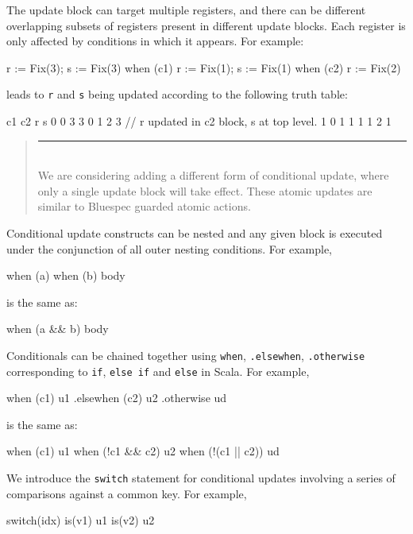 \documentclass[twocolumn,10pt]{article}
\newenvironment{commentary}
{ \vspace{-0.1in}
  \begin{quotation}
  \noindent
  \small \em
  \rule{\linewidth}{1pt}\\
}
{
  \end{quotation}
}
\def\code#1{{\tt #1}}
\begin{document}
The update block can target multiple registers, and there can be
different overlapping subsets of registers present in different update
blocks.  Each register is only affected by conditions in which it
appears.  For example:
\begin{scala}
r := Fix(3); s := Fix(3)
when (c1)   { r := Fix(1); s := Fix(1) }
when (c2)   { r := Fix(2) }
\end{scala}

\noindent
leads to \code{r} and \code{s} being updated according to the
following truth table:
\begin{scala}
c1 c2  r  s
0   0  3  3
0   1  2  3 // r updated in c2 block, s at top level.
1   0  1  1
1   1  2  1
\end{scala}

\begin{commentary}
We are considering adding a different form of conditional update,
where only a single update block will take effect.  These atomic
updates are similar to Bluespec guarded atomic actions.
\end{commentary}

Conditional update constructs can be nested and any given block is
executed under the conjunction of all outer nesting conditions.  For
example,
\begin{scala}
when (a) { when (b) { body } }
\end{scala}

\noindent
is the same as:
\begin{scala}
when (a && b) { body }
\end{scala}

Conditionals can be chained together using
\verb+when+, \verb+.elsewhen+, \verb+.otherwise+ corresponding to
\verb+if+, \verb+else if+ and \verb+else+ in Scala.  For example,
\begin{scala}
when (c1) { u1 }
.elsewhen (c2) { u2 }
.otherwise { ud }
\end{scala}
\noindent
is the same as:
\begin{scala}
when (c1) { u1 }
when (!c1 && c2) { u2 }
when (!(c1 || c2)) { ud }
\end{scala}

We introduce the \code{switch} statement for conditional updates
involving a series of comparisons against a common key.  For example,
\begin{scala}
switch(idx) {
 is(v1) { u1 }
 is(v2) { u2 }
}
\end{scala}
\end{document}
